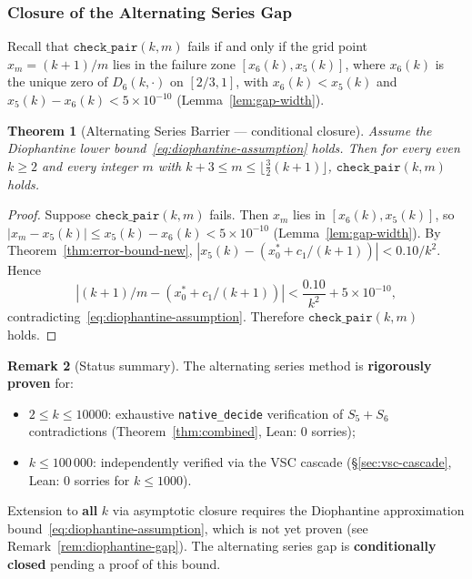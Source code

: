\documentclass[12pt,a4paper]{article}
\theoremstyle{plain}
\newtheorem{theorem}{Theorem}[section]
\theoremstyle{definition}
\newtheorem{remark}[theorem]{Remark}
\begin{document}
\subsubsection{Closure of the Alternating Series Gap}
\label{sec:closure}

Recall that $\texttt{check\_pair}(k,m)$ fails if and only if the grid point
$x_m = (k+1)/m$ lies in the failure zone $[x_6(k), x_5(k)]$, where
$x_6(k)$ is the unique zero of $D_6(k,\cdot)$ on $[2/3,1]$, with
$x_6(k) < x_5(k)$ and $x_5(k) - x_6(k) < 5 \times 10^{-10}$
(Lemma~\ref{lem:gap-width}).

\begin{theorem}[Alternating Series Barrier --- conditional closure]
  \label{thm:asymp-closure}
  Assume the Diophantine lower
  bound~\eqref{eq:diophantine-assumption} holds.  Then for every even
  $k \ge 2$ and every integer $m$ with
  $k+3 \le m \le \lfloor\frac{3}{2}(k+1)\rfloor$,
  $\texttt{check\_pair}(k,m)$ holds.
\end{theorem}

\begin{proof}
  Suppose $\texttt{check\_pair}(k,m)$ fails.  Then $x_m$
  lies in $[x_6(k), x_5(k)]$, so
  $|x_m - x_5(k)| \le x_5(k) - x_6(k) < 5 \times 10^{-10}$
  (Lemma~\ref{lem:gap-width}).
  By Theorem~\ref{thm:error-bound-new},
  $|x_5(k) - (x_0^* + c_1/(k+1))| < 0.10/k^2$.
  Hence
  \[
    |(k+1)/m - (x_0^* + c_1/(k+1))|
    < \frac{0.10}{k^2} + 5 \times 10^{-10},
  \]
  contradicting~\eqref{eq:diophantine-assumption}.
  Therefore $\texttt{check\_pair}(k,m)$ holds.
\end{proof}

\begin{remark}[Status summary]
  The alternating series method is \textbf{rigorously proven} for:
  \begin{itemize}[nosep]
    \item $2 \le k \le 10000$: exhaustive \texttt{native\_decide}
      verification of $S_5+S_6$ contradictions
      (Theorem~\ref{thm:combined}, Lean: 0 sorries);
    \item $k \le 100\,000$: independently verified via the VSC cascade
      (\S\ref{sec:vsc-cascade}, Lean: 0 sorries for $k \le 1000$).
  \end{itemize}
  Extension to \textbf{all} $k$ via asymptotic closure requires the
  Diophantine approximation
  bound~\eqref{eq:diophantine-assumption}, which is not yet proven
  (see Remark~\ref{rem:diophantine-gap}).  The alternating series gap
  is \textbf{conditionally closed} pending a proof of this bound.
\end{remark}
\end{document}
